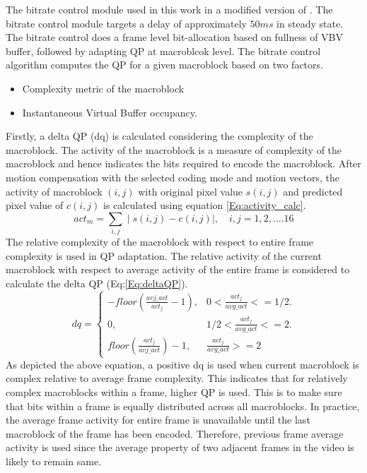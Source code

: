 \documentclass[11pt]{article} %
\begin{document}
 The bitrate control module used in this work in a modified version of \cite{JVTF086}. The bitrate control module targets a delay of approximately $50ms$ in steady state. The bitrate control does a frame level bit-allocation based on fullness of VBV buffer, followed by adapting QP at macroblcok level. The bitrate control algorithm computes the QP for a given macroblock based on two factors.
  
\begin{itemize}  
\item Complexity metric of the macroblock
\item Instantaneous Virtual Buffer occupancy.
\end{itemize}	
	Firstly, a delta QP (dq) is calculated considering the complexity of the macroblock. The activity of the macroblock is a measure of complexity of the macroblock and hence indicates the bits required to encode the macroblock. After motion compensation with the selected coding mode and motion vectors, the activity of macroblock $(i,j)$ with original pixel value $s(i,j)$ and predicted pixel value of $c(i,j)$ is calculated using equation \ref{Eq:activity_calc}. 
\begin{equation}
	\label{Eq:activity_calc}
	act_m = \sum_{i,j} \mid s(i,j)-c(i,j) \mid ,\quad	i,j = 1,2,....16
\end{equation}	
	 The relative complexity of the macroblock with respect to entire frame complexity is used in QP adaptation. The relative activity of the current macroblock with respect to average activity of the entire frame is considered to calculate the delta QP (Eq:\ref{Eq:deltaQP}).
\begin{equation}
	\label{Eq:deltaQP}
	dq = \begin{cases}
		-floor(\frac{avj\_act} {act_j} - 1), &  0 < \frac{act_j}{avg\_act} <= 1/2.\\
		0, & 1/2 < \frac{act_j}{avg\_act} <= 2.\\
		floor(\frac{act_j} {avj\_act}) - 1, & \frac{act_j}{avg\_act} >= 2
	\end{cases}
\end{equation}
As depicted the above equation, a positive dq is used when current macroblock is complex relative to average frame complexity. This indicates that for relatively complex macroblocks within a frame, higher QP is used. This is to make sure that bits within a frame is equally distributed across all macroblocks. In practice, the average frame activity for entire frame is unavailable until the last macroblock of the frame has been encoded. Therefore, previous frame average activity is used since the average property of two adjacent frames in the video is likely to remain same. 
\end{document}
